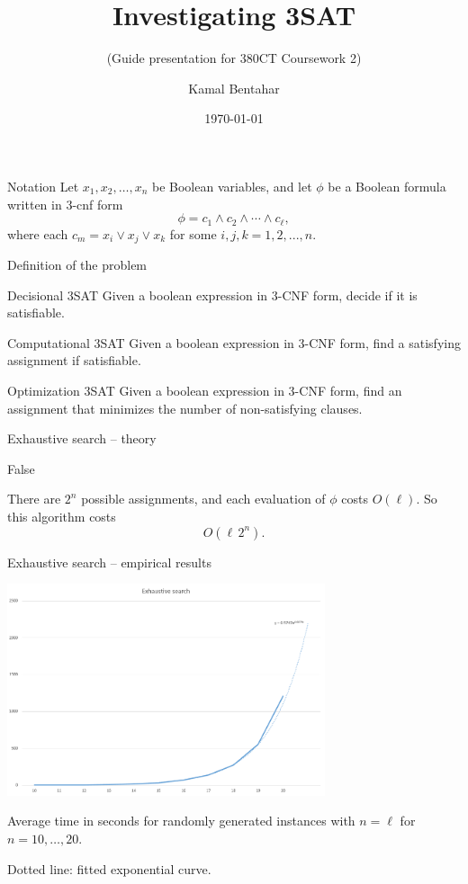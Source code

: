 \documentclass[12pt]{beamer}
\author{Kamal Bentahar}
\title{Investigating 3SAT}
\subtitle{(Guide presentation for 380CT Coursework 2)}
\date{\today}
\begin{document}
	\maketitle
	
\begin{frame}{Notation}
	Let $x_1,x_2,\ldots,x_n$ be Boolean variables, and let $\phi$ be a Boolean formula written in 3-cnf form
	\[
	\phi = c_1\land c_2\land \cdots \land c_\ell,
	\]
where each $c_m=x_i\lor x_j\lor x_k$ for some $i,j,k=1,2,...,n$.
\end{frame}

\begin{frame}{Definition of the problem}
	\begin{block}{Decisional 3SAT}
		Given a boolean expression in 3-CNF form, decide if it is satisfiable.
	\end{block}

	\begin{block}{Computational 3SAT}
		Given a boolean expression in 3-CNF form, find a satisfying assignment if satisfiable.
	\end{block}

	\begin{block}{Optimization 3SAT}
		Given a boolean expression in 3-CNF form, find an assignment that minimizes the number of non-satisfying clauses.
	\end{block}
\end{frame}

\begin{frame}
{Exhaustive search -- theory}

\begin{algorithmic}[1]\sffamily
{}
	\EndIf
\EndFor
\State \Return False
\end{algorithmic}

\vfill

There are $2^n$ possible assignments, and each  evaluation of $\phi$ costs $O(\ell)$. So this algorithm costs \[O(\ell\, 2^n).\]
\end{frame}

\begin{frame}
{Exhaustive search -- empirical results}

\begin{center}
\includegraphics[width=0.7\textwidth]{img/exh2}
\end{center}

Average time in seconds for randomly generated instances with $n=\ell$ for $n=10,\ldots,20$.

Dotted line: fitted exponential curve.

\end{frame}
\end{document}
